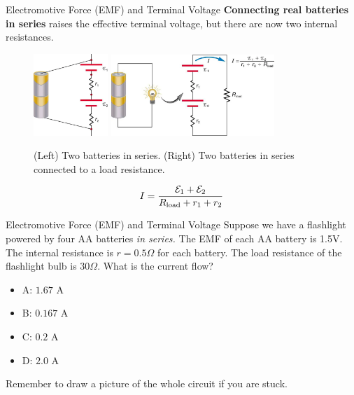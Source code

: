 \documentclass{beamer}
\begin{document}
\begin{frame}{Electromotive Force (EMF) and Terminal Voltage}
\small
\textbf{\alert{Connecting real batteries in series}} raises the effective terminal voltage, but there are now two internal resistances.
\begin{figure}
\includegraphics[width=0.25\textwidth]{figures/internal_batt_4.png} \hspace{1cm}
\includegraphics[width=0.55\textwidth]{figures/internal_batt_5.png}
\caption{\label{fig:internal_r4} (Left) Two batteries in series. (Right) Two batteries in series connected to a load resistance.}
\end{figure}
\begin{equation}
I = \frac{\mathcal{E}_1 + \mathcal{E}_2}{R_{\rm load} + r_1 + r_2}
\end{equation}
\end{frame}

\begin{frame}{Electromotive Force (EMF) and Terminal Voltage}
Suppose we have a flashlight powered by four AA batteries \textit{in series.}  The EMF of each AA battery is 1.5V.  The internal resistance is $r = 0.5\Omega$ for each battery.  The load resistance of the flashlight bulb is $30 \Omega$.  What is the current flow?
\begin{itemize}
\item A: $1.67$ A
\item B: $0.167$ A
\item C: $0.2$ A
\item D: $2.0$ A
\end{itemize}
\footnotesize{Remember to draw a picture of the whole circuit if you are stuck.}
\end{frame}
\end{document}

